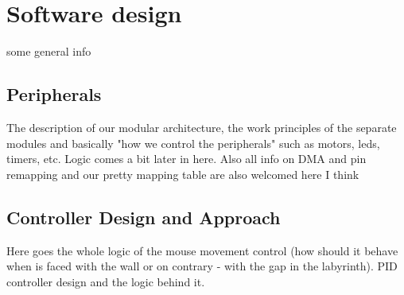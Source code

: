 \section{Software design}
some general info

\subsection{Peripherals} %
The description of our modular architecture, the work principles of the separate modules and basically "how we control the peripherals" such as motors, leds, timers, etc. Logic comes a bit later in here.
Also all info on DMA and pin remapping and our pretty mapping table are also welcomed here I think

\subsection{Controller Design and Approach}

Here goes the whole logic of the mouse movement control (how should it behave when is faced with the wall or on contrary - with the gap in the labyrinth). PID controller design and the logic behind it.



